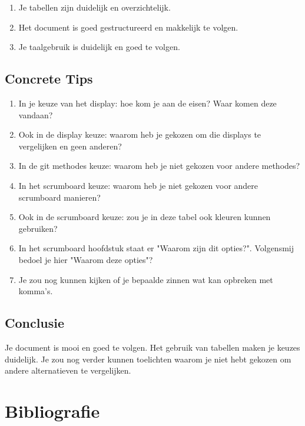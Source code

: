 \documentclass[a4paper]{report}
\begin{document}
\begin{enumerate}
  \item Je tabellen zijn duidelijk en overzichtelijk. 
  \item Het document is goed gestructureerd en makkelijk te volgen. 
  \item Je taalgebruik is duidelijk en goed te volgen.
\end{enumerate}

\section{Concrete Tips}
\begin{enumerate}
  \item In je keuze van het display: hoe kom je aan de eisen? Waar komen deze vandaan?
  \item Ook in de display keuze: waarom heb je gekozen om die displays te vergelijken en geen anderen?
  \item In de git methodes keuze: waarom heb je niet gekozen voor andere methodes?
  \item In het scrumboard keuze: waarom heb je niet gekozen voor andere scrumboard manieren?
  \item Ook in de scrumboard keuze: zou je in deze tabel ook kleuren kunnen gebruiken?
  \item In het scrumboard hoofdstuk staat er "Waarom zijn dit opties?". Volgensmij bedoel je hier "Waarom deze opties"?
  \item Je zou nog kunnen kijken of je bepaalde zinnen wat kan opbreken met komma's. 

\end{enumerate}

\section{Conclusie}
Je document is mooi en goed te volgen. Het gebruik van tabellen maken je keuzes duidelijk.
Je zou nog verder kunnen toelichten waarom je niet hebt gekozen om andere alternatieven te vergelijken.

\chapter{Bibliografie}
\begingroup
\renewcommand{\chapter}[2]{} %
\renewcommand{\addcontentsline}[3]{} %


\endgroup

\end{document}
